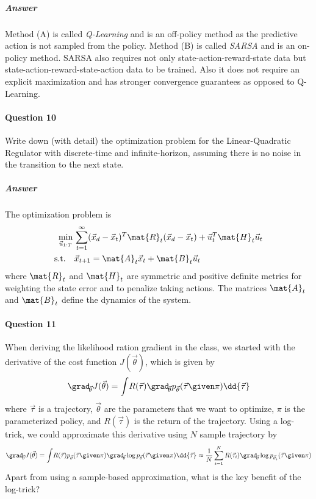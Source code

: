 		\subparagraph{Answer}
			Method (A) is called \emph{Q-Learning} and is an off-policy method as the predictive action is not sampled from the policy. Method (B) is called \emph{SARSA} and is an on-policy method. SARSA also requires not only state-action-reward-state data but state-action-reward-state-action data to be trained. Also it does not require an explicit maximization and has stronger convergence guarantees as opposed to Q-Learning.

	\paragraph{Question 10}
		Write down (with detail) the optimization problem for the Linear-Quadratic Regulator with discrete-time and infinite-horizon, assuming there is no noise in the transition to the next state.

		\subparagraph{Answer}
			The optimization problem is
			\begin{equation*}
				\begin{aligned}
					\min_{\vec{u}_{1:T}} \, & \sum_{t = 1}^{\infty} (\vec{x}_d - \vec{x}_t)^T \mat{R}_t (\vec{x}_d - \vec{x}_t) + \vec{u}_t^T \mat{H}_t \vec{u}_t \\
					\mathrm{s.t.} \quad     &
					\begin{aligned}
						\vec{x}_{t + 1} & = \mat{A}_t \vec{x}_t + \mat{B}_t \vec{u}_t
					\end{aligned}
				\end{aligned}
			\end{equation*}
			where \(\mat{R}_t\) and \(\mat{H}_t\) are symmetric and positive definite metrics for weighting the state error and to penalize taking actions. The matrices \(\mat{A}_t\) and \(\mat{B}_t\) define the dynamics of the system.

	\paragraph{Question 11}
		When deriving the likelihood ration gradient in the class, we started with the derivative of the cost function \( J(\vec{\theta}) \), which is given by
		\begin{equation*}
			\grad_{\!\vec{\theta}} J(\vec{\theta}) = \int\! R(\vec{\tau}) \grad_{\!\vec{\theta}} p_{\vec{\theta}}(\vec{\tau} \given \pi) \dd{\vec{\tau}}
		\end{equation*}
		where \(\vec{\tau}\) is a trajectory, \(\vec{\theta}\) are the parameters that we want to optimize, \(\pi\) is the parameterized policy, and \(R(\vec{\tau})\) is the return of the trajectory. Using a log-trick, we could approximate this derivative using \(N\) sample trajectory by
		\begin{equation*}
			\grad_{\!\vec{\theta}} J(\vec{\theta})
			= \int\! R(\vec{\tau}) p_{\vec{\theta}}(\vec{\tau} \given \pi) \grad_{\!\vec{\theta}} \log p_{\vec{\theta}}(\vec{\tau} \given \pi) \dd{\vec{\tau}}
			\approx \frac{1}{N} \sum_{i = 1}^{N} R(\vec{\tau}_i) \grad_{\!\vec{\theta}} \log p_{\vec{\theta}_i}(\vec{\tau} \given \pi)
		\end{equation*}
		Apart from using a sample-based approximation, what is the key benefit of the log-trick?

